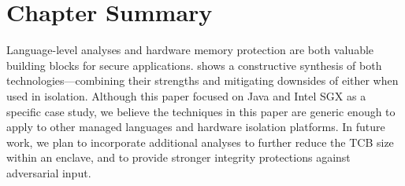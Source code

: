 \section{Chapter Summary}
\label{sec:civet:summary}

Language-level analyses and hardware memory protection are both valuable
building blocks for secure applications.
\sysname{} shows a constructive synthesis of both technologies---combining their strengths
and mitigating downsides of either when used in isolation.
Although this paper focused on Java and Intel SGX as a specific case study,
we believe the techniques in this paper are generic enough to apply to
other managed languages and hardware isolation platforms.
In future work, we plan to incorporate additional analyses
to further reduce the TCB size within an enclave, and to provide
stronger integrity protections against adversarial input.



